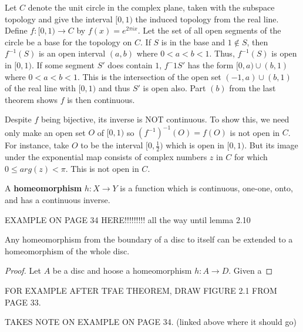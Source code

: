 \begin{example}
    Let $C$ denote the unit circle in the complex plane, taken with the subspace topology and give the interval $[0, 1)$ the induced topology from the real line. Define $f\colon[0,1)\to C$ by $f(x) = e^{2\pi ix}$. Let the set of all open segments of the circle be a base for the topology on $C$. If $S$ is in the base and $1 \notin S$, then $f^{-1}(S)$ is an open interval $(a,b)$ where $0<a<b<1$. Thus, $f^{-1}(S)$ is open in $[0,1)$. If some segment $S'$ does contain $1$, $f^-1{S'}$ has the form $[0,a)\cup(b,1)$ where $0<a<b<1$. This is the intersection of the open set $(-1,a)\cup(b,1)$ of the real line with $[0,1)$ and thus $S'$ is open also. Part $(b)$ from the last theorem shows $f$ is then continuous. 
    
    Despite $f$ being bijective, its inverse is NOT continuous. To show this, we need only make an open set $O$ of $[0,1)$ so $(f^{-1})^{-1}(O) = f(O)$ is not open in $C$. For instance, take $O$ to be the interval $[0, \frac{1}{2})$ which is open in $[0,1)$. But its image under the exponential map consists of complex numbers $z$ in $C$ for which $0 \leq arg(z) < \pi$. This is not open in $C$.
\end{example}
\begin{definition}[Homeomorphism]
    A \textbf{homeomorphism} $h\colon X\to Y$ is a function which is continuous, one-one, onto, and has a continuous inverse. 
\end{definition}
\begin{example}
    EXAMPLE ON PAGE 34 HERE!!!!!!!!! all the way until lemma 2.10
\end{example}
\begin{lemma}
    Any homeomorphism from the boundary of a disc to itself can be extended to a homeomorphism of the whole disc.
\end{lemma}
\begin{proof}
    Let $A$ be a disc and hoose a homeomorphism $h \colon A \to D$. Given a 
\end{proof}

FOR EXAMPLE AFTER TFAE THEOREM, DRAW FIGURE 2.1 FROM PAGE 33.

TAKES NOTE ON EXAMPLE ON PAGE 34. (linked above where it should go)